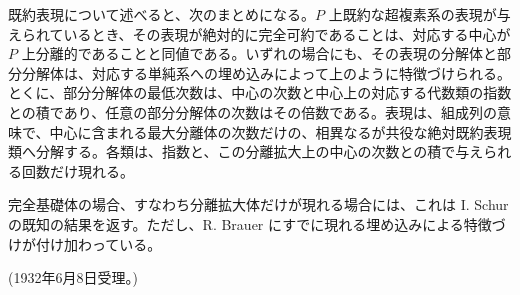 既約表現について述べると、次のまとめになる。\(P\) 上既約な超複素系の表現が与えられているとき、その表現が絶対的に完全可約であることは、対応する中心が \(P\) 上分離的であることと同値である。いずれの場合にも、その表現の分解体と部分分解体は、対応する単純系への埋め込みによって上のように特徴づけられる。とくに、部分分解体の最低次数は、中心の次数と中心上の対応する代数類の指数との積であり、任意の部分分解体の次数はその倍数である。表現は、組成列の意味で、中心に含まれる最大分離体の次数だけの、相異なるが共役な絶対既約表現類へ分解する。各類は、指数と、この分離拡大上の中心の次数との積で与えられる回数だけ現れる。

完全基礎体の場合、すなわち分離拡大体だけが現れる場合には、これは I. Schur の既知の結果を返す。ただし、R. Brauer にすでに現れる埋め込みによる特徴づけが付け加わっている。

\begin{center}
(1932年6月8日受理。)
\end{center}
